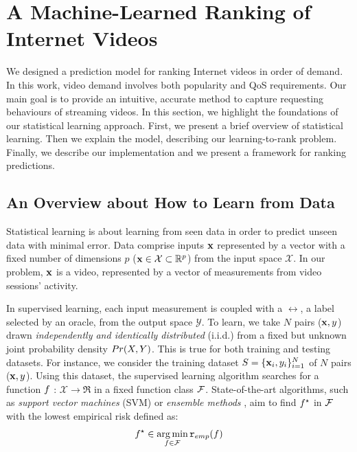 \section{A Machine-Learned Ranking of Internet Videos}
\label{sec:learning_model}

We designed a prediction model for ranking Internet videos in order of demand. In this work, video demand involves both popularity and QoS requirements. Our main goal is to provide an intuitive, accurate method to capture requesting behaviours of streaming videos. In this section, we highlight the foundations of our statistical learning approach. First, we present a brief overview of statistical learning. Then we explain the model, describing our learning-to-rank problem. Finally, we describe our implementation and we present a framework for ranking predictions.

\subsection{An Overview about How to Learn from Data}
\label{subsec:learning_model_overview}

Statistical learning is about learning from seen data in order to predict unseen data with minimal error. Data comprise inputs ${\bf x}$ represented by a vector with a fixed
  number of dimensions $p$ (${\bf x} \in {\cal X} \subset \mathbb{R}^p$) from the input space $\mathcal{X}$. In our problem, ${\bf x}$ is a video, represented by a vector of measurements from video sessions' activity.

In supervised learning, each input measurement is coupled with a $\rel$, a label selected by an oracle, from the output space $\mathcal{Y}$. To learn, we take $N$ pairs (${\bf x},y$) drawn \emph{independently and identically distributed} (i.i.d.) from a fixed but unknown joint probability density ${Pr(X,Y)}$. This is true  for both training and testing datasets. For instance, we consider the training dataset  $S = \{{\bf x}_i,y_i\}_{i=1}^N$ of $N$ pairs (${\bf x},y$). Using this dataset, the supervised learning algorithm searches for a function $f$ : $\mathcal{X} \rightarrow \Re$  in a fixed function class ${\cal F}$. State-of-the-art algorithms, such as \emph{support vector machines} (\textsc{SVM}) \cite{svm_1995} or \emph{ensemble methods} \cite{elements_of_statistical_learning_2001}, aim to find $f^\star$ in ${\cal F}$ with the lowest empirical risk defined as:
\begin{equation}
\label{eq:erm}
f^\star \in \operatorname*{arg\,min}_{f \in {\cal F}} {\tt r}_{emp}(f)
\end{equation}

